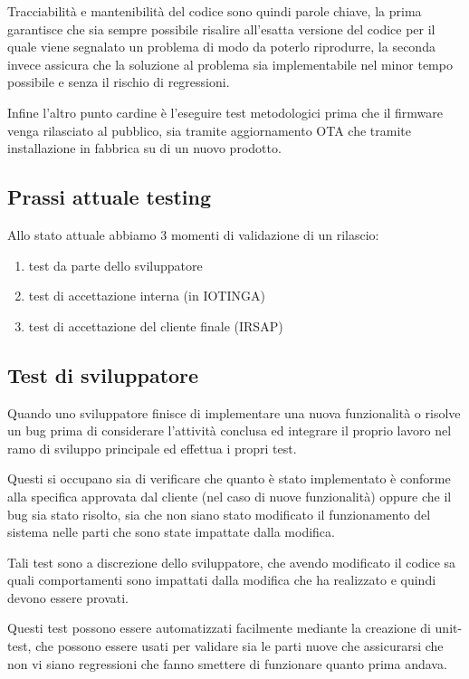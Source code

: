 \documentclass[12pt,a4paper,twoside,titlepage]{book}
\begin{document}
Tracciabilità e mantenibilità del codice sono quindi parole chiave, la prima garantisce che
sia sempre possibile risalire all'esatta versione del codice per il quale viene segnalato un
problema di modo da poterlo riprodurre, la seconda invece assicura che la soluzione al problema
sia implementabile nel minor tempo possibile e senza il rischio di regressioni.

Infine l'altro punto cardine è l'eseguire test metodologici prima che il firmware venga
rilasciato al pubblico, sia tramite aggiornamento OTA che tramite installazione in fabbrica
su di un nuovo prodotto.

\subsection{Prassi attuale testing}

Allo stato attuale abbiamo 3 momenti di validazione di un rilascio:

\begin{enumerate}
    \item test da parte dello sviluppatore
    \item test di accettazione interna (in IOTINGA)
    \item test di accettazione del cliente finale (IRSAP)
\end{enumerate}

\subsection{Test di sviluppatore}

Quando uno sviluppatore finisce di implementare una nuova funzionalità o risolve un
bug  prima di considerare l'attività conclusa ed integrare il
proprio lavoro nel ramo di sviluppo principale ed effettua i propri test.

Questi si occupano sia di verificare che quanto è stato implementato è conforme
alla specifica approvata dal cliente (nel caso di nuove funzionalità) oppure che
il bug sia stato risolto, sia che non siano stato modificato il funzionamento del sistema
nelle parti che sono state impattate dalla modifica.

Tali test sono a discrezione dello sviluppatore, che avendo modificato il codice sa
quali comportamenti sono impattati dalla modifica che ha realizzato e quindi devono essere
provati.

Questi test possono essere automatizzati facilmente mediante la creazione di unit-test,
che possono essere usati per validare sia le parti nuove che assicurarsi che non vi siano
regressioni che fanno smettere di funzionare quanto prima andava.
\end{document}
